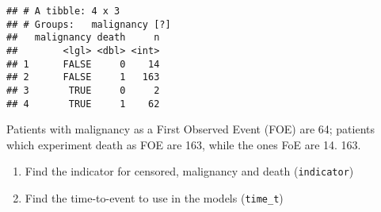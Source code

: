 \documentclass[]{book}
\newenvironment{Shaded}{\begin{snugshade}}{\end{snugshade}}
\newcommand{\KeywordTok}[1]{\textcolor[rgb]{0.13,0.29,0.53}{\textbf{{#1}}}}
\newcommand{\DataTypeTok}[1]{\textcolor[rgb]{0.13,0.29,0.53}{{#1}}}
\newcommand{\DecValTok}[1]{\textcolor[rgb]{0.00,0.00,0.81}{{#1}}}
\newcommand{\StringTok}[1]{\textcolor[rgb]{0.31,0.60,0.02}{{#1}}}
\newcommand{\OtherTok}[1]{\textcolor[rgb]{0.56,0.35,0.01}{{#1}}}
\newcommand{\NormalTok}[1]{{#1}}
\providecommand{\tightlist}{%
  \setlength{\itemsep}{0pt}\setlength{\parskip}{0pt}}
\theoremstyle{definition}
\theoremstyle{definition}
\theoremstyle{definition}
\theoremstyle{remark}
\begin{document}
\begin{Shaded}
\end{Shaded}

\begin{verbatim}
## # A tibble: 4 x 3
## # Groups:   malignancy [?]
##   malignancy death     n
##        <lgl> <dbl> <int>
## 1      FALSE     0    14
## 2      FALSE     1   163
## 3       TRUE     0     2
## 4       TRUE     1    62
\end{verbatim}

Patients with malignancy as a First Observed Event (FOE) are 64;
patients which experiment death as FOE are 163, while the ones FoE are
14. 163.

\begin{enumerate}
\def\labelenumi{\arabic{enumi}.}
\setcounter{enumi}{1}
\tightlist
\item
  Find the indicator for censored, malignancy and death
  (\texttt{indicator})
\item
  Find the time-to-event to use in the models (\texttt{time\_t})
\end{enumerate}

\begin{Shaded}
\end{Shaded}
\end{document}
